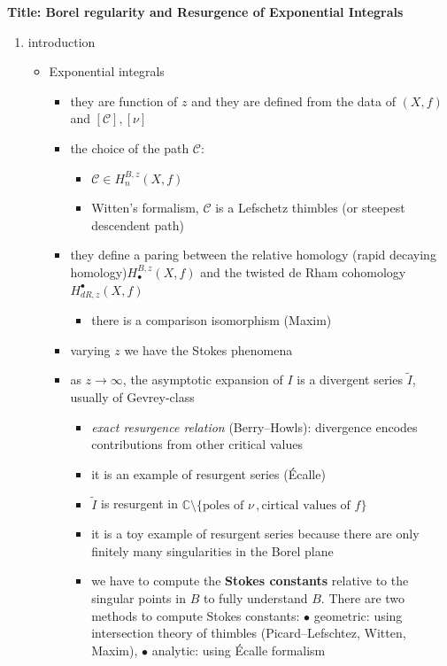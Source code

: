 \documentclass{article}
\newcommand{\C}{\mathbb{C}}
\begin{document}
\textbf{Title: Borel regularity and Resurgence of Exponential Integrals}

\begin{enumerate}
\item introduction
\begin{itemize}
\item Exponential integrals
\begin{itemize}
\item they are function of $z$ and they are defined from the data of $(X,f)$ and $[\mathcal{C}], [\nu]$
\item the choice of the path $\mathcal{C}$: 
\begin{itemize}
\item $\mathcal{C}\in H^{B,z}_{n}(X,f)$
\item Witten's formalism, $\mathcal{C}$ is a Lefschetz thimbles (or steepest descendent path)
\end{itemize}
\item they define a paring between the relative homology (rapid decaying homology)$H^{B,z}_{\bullet}(X,f)$ and the twisted de Rham cohomology  $H_{dR,z}^{\bullet}(X,f)$
\begin{itemize}
\item there is a comparison isomorphism (Maxim)
\end{itemize}
\item varying $z$ we have the Stokes phenomena
\item as $z\to\infty$, the asymptotic expansion of $I$ is a divergent series $\tilde{I}$, usually of Gevrey-class
\begin{itemize}
\item {\it exact resurgence relation} (Berry--Howls): divergence encodes contributions from other critical values
\item it is an example of resurgent series (\'Ecalle)
\item $\tilde{I}$ is resurgent in $\C\setminus\lbrace \text{poles of } \nu\,, \text{cirtical values of } f\rbrace$
\item it is a toy example of resurgent series because there are only finitely many singularities in the Borel plane
\item we have to compute the \textbf{Stokes constants} relative to the singular points in $B$ to fully understand $B$. There are two methods to compute Stokes constants: $\bullet$ geometric: using intersection theory of thimbles (Picard--Lefschtez, Witten, Maxim), $\bullet$ analytic: using \'Ecalle formalism   
\end{itemize} 

\end{itemize}
\end{itemize}
\end{enumerate}
\end{document}

